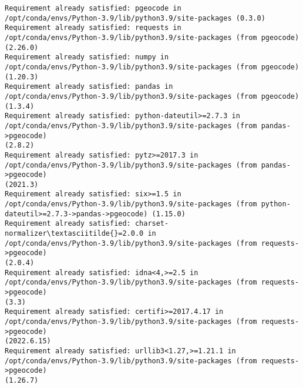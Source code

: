 \documentclass[11pt]{article}
\begin{document}
    
    
    \begin{Verbatim}[commandchars=\\\{\}]
Requirement already satisfied: pgeocode in
/opt/conda/envs/Python-3.9/lib/python3.9/site-packages (0.3.0)
Requirement already satisfied: requests in
/opt/conda/envs/Python-3.9/lib/python3.9/site-packages (from pgeocode) (2.26.0)
Requirement already satisfied: numpy in
/opt/conda/envs/Python-3.9/lib/python3.9/site-packages (from pgeocode) (1.20.3)
Requirement already satisfied: pandas in
/opt/conda/envs/Python-3.9/lib/python3.9/site-packages (from pgeocode) (1.3.4)
Requirement already satisfied: python-dateutil>=2.7.3 in
/opt/conda/envs/Python-3.9/lib/python3.9/site-packages (from pandas->pgeocode)
(2.8.2)
Requirement already satisfied: pytz>=2017.3 in
/opt/conda/envs/Python-3.9/lib/python3.9/site-packages (from pandas->pgeocode)
(2021.3)
Requirement already satisfied: six>=1.5 in
/opt/conda/envs/Python-3.9/lib/python3.9/site-packages (from python-
dateutil>=2.7.3->pandas->pgeocode) (1.15.0)
Requirement already satisfied: charset-normalizer\textasciitilde{}=2.0.0 in
/opt/conda/envs/Python-3.9/lib/python3.9/site-packages (from requests->pgeocode)
(2.0.4)
Requirement already satisfied: idna<4,>=2.5 in
/opt/conda/envs/Python-3.9/lib/python3.9/site-packages (from requests->pgeocode)
(3.3)
Requirement already satisfied: certifi>=2017.4.17 in
/opt/conda/envs/Python-3.9/lib/python3.9/site-packages (from requests->pgeocode)
(2022.6.15)
Requirement already satisfied: urllib3<1.27,>=1.21.1 in
/opt/conda/envs/Python-3.9/lib/python3.9/site-packages (from requests->pgeocode)
(1.26.7)
    \end{Verbatim}
\end{document}
